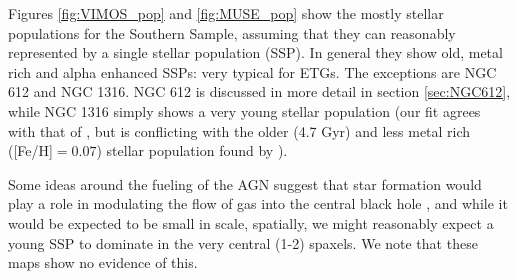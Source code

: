 		Figures \ref{fig:VIMOS_pop} and \ref{fig:MUSE_pop} show the mostly stellar populations for the Southern Sample, assuming that they can reasonably represented by a single stellar population (SSP). In general they show old, metal rich and alpha enhanced SSPs: very typical for ETGs. The exceptions are NGC 612 and NGC 1316. NGC 612 is discussed in more detail in section \ref{sec:NGC612}, while NGC 1316 simply shows a very young stellar population (our fit agrees with that of \citet{Kuntschner2000}, but is conflicting with the older (4.7 Gyr) and less metal rich ([Fe/H]$ = 0.07$) stellar population found by \citet{Koleva2011}). 

		Some ideas around the fueling of the AGN suggest that star formation would play a role in modulating the flow of gas into the central black hole \citep{}, and while it would be expected to be small in scale, spatially, we might reasonably expect a young SSP to dominate in the very central (1-2) spaxels. We note that these maps show no evidence of this. 

